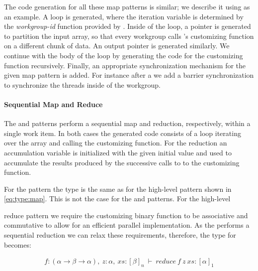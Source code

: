 The code generation for all these map patterns is similar; we describe it using  as an example.
A loop is generated, where the iteration variable is determined by the \emph{workgroup-id} function provided by \OpenCL.
Inside of the loop, a pointer is generated to partition the input array, so that every workgroup calls 's customizing function on a different chunk of data.
An output pointer is generated similarly.
We continue with the body of the loop by generating the code for the customizing function recursively.
Finally, an appropriate synchronization mechanism for the given map pattern is added.
For instance after a  we add a barrier synchronization to synchronize the threads inside of the workgroup.




\paragraph{Sequential Map and Reduce}
The  and  patterns perform a sequential map and reduction, respectively, within a single work item.
In both cases the generated code consists of a loop iterating over the array and calling the customizing function.
For the reduction an accumulation variable is initialized with the given initial value and used to accumulate the results produced by the successive calls to to the customizing function.

For the  pattern the type is the same as for the high-level  pattern shown in \autoref{eq:type:map}.
This is not the case for the  and  patterns.
For the high-level \par{reduce} pattern we require the customizing binary function to be associative and commutative to allow for an efficient parallel implementation.
As the  performs a sequential reduction we can relax these requirements, therefore, the type for  becomes:

\begin{align}
  f : (\alpha \rightarrow \beta \rightarrow \alpha),\ z : \alpha,\ xs : [\beta]_n\ \vdash\ reduce\ f\ z\ xs : [\alpha]_1
  \label{eq:type:reduce-seq}
\end{align}

